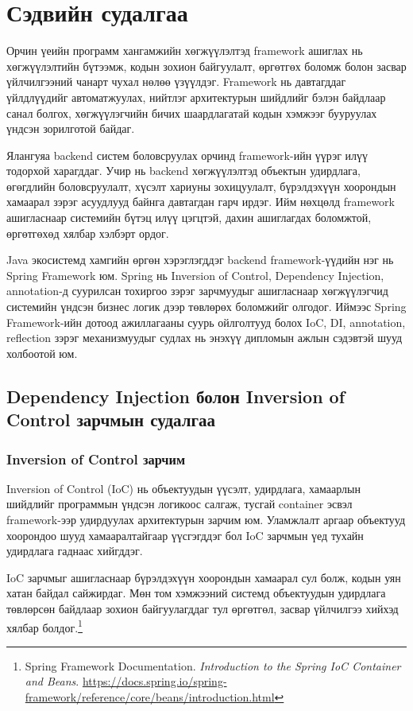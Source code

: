 \chapter{Сэдвийн судалгаа}

Орчин үеийн программ хангамжийн хөгжүүлэлтэд framework ашиглах нь хөгжүүлэлтийн бүтээмж, кодын зохион байгуулалт, өргөтгөх боломж болон засвар үйлчилгээний чанарт чухал нөлөө үзүүлдэг. Framework нь давтагддаг үйлдлүүдийг автоматжуулах, нийтлэг архитектурын шийдлийг бэлэн байдлаар санал болгох, хөгжүүлэгчийн бичих шаардлагатай кодын хэмжээг бууруулах үндсэн зорилготой байдаг.

Ялангуяа backend систем боловсруулах орчинд framework-ийн үүрэг илүү тодорхой харагддаг. Учир нь backend хөгжүүлэлтэд объектын удирдлага, өгөгдлийн боловсруулалт, хүсэлт хариуны зохицуулалт, бүрэлдэхүүн хоорондын хамаарал зэрэг асуудлууд байнга давтагдан гарч ирдэг. Ийм нөхцөлд framework ашигласнаар системийн бүтэц илүү цэгцтэй, дахин ашиглагдах боломжтой, өргөтгөхөд хялбар хэлбэрт ордог.

Java экосистемд хамгийн өргөн хэрэглэгддэг backend framework-үүдийн нэг нь Spring Framework юм. Spring нь Inversion of Control, Dependency Injection, annotation-д суурилсан тохиргоо зэрэг зарчмуудыг ашигласнаар хөгжүүлэгчид системийн үндсэн бизнес логик дээр төвлөрөх боломжийг олгодог. Иймээс Spring Framework-ийн дотоод ажиллагааны суурь ойлголтууд болох IoC, DI, annotation, reflection зэрэг механизмуудыг судлах нь энэхүү дипломын ажлын сэдэвтэй шууд холбоотой юм.

\newpage
\section{Dependency Injection болон Inversion of Control зарчмын судалгаа}

\subsection{Inversion of Control зарчим}

Inversion of Control (IoC) нь объектуудын үүсэлт, удирдлага,
хамаарлын шийдлийг программын үндсэн логикоос салгаж, тусгай
container эсвэл framework-ээр удирдуулах архитектурын зарчим
юм.
Уламжлалт аргаар объектууд хоорондоо шууд хамааралтайгаар
үүсгэгддэг бол IoC зарчмын үед тухайн удирдлага гаднаас
хийгддэг.

IoC зарчмыг ашигласнаар бүрэлдэхүүн хоорондын хамаарал сул
болж, кодын уян хатан байдал сайжирдаг. Мөн том хэмжээний
системд объектуудын удирдлага төвлөрсөн байдлаар зохион
байгуулагддаг тул өргөтгөл, засвар үйлчилгээ хийхэд хялбар
болдог.\footnote{Spring Framework Documentation.
\textit{Introduction to the Spring IoC Container and Beans}.
\url{https://docs.spring.io/spring-framework/reference/core/beans/introduction.html}}

